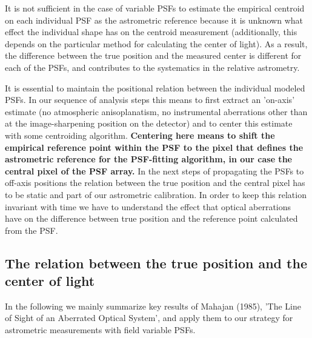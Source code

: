 It is not sufficient in the case of variable PSFs to estimate the empirical centroid on each individual PSF as the astrometric reference because it is unknown what effect the individual shape has on the centroid measurement (additionally, this depends on the particular method for calculating the center of light). As a result, the difference between the true position and the measured center is different for each of the PSFs, and contributes to the systematics in the relative astrometry.

It is essential to maintain the positional relation between the individual modeled PSFs. In our sequence of analysis steps this means to first extract an 'on-axis' estimate (no atmospheric anisoplanatism, no instrumental aberrations other than at the image-sharpening position on the detector) and to center this estimate with some centroiding algorithm. {\bf Centering here means to shift the empirical reference point within the PSF to the pixel that defines the astrometric reference for the PSF-fitting algorithm, in our case the central pixel of the PSF array.} In the next steps of propagating the PSFs to off-axis positions the relation between the true position and the central pixel has to be static and part of our astrometric calibration. In order to keep this relation invariant with time we have to understand the effect that optical aberrations have on the difference between true position and the reference point calculated from the PSF.  

\subsection{The relation between the true position and the center of light}

In the following we mainly summarize key results of Mahajan (1985), 'The Line of Sight of an Aberrated Optical System', and apply them to our strategy for astrometric measurements with field variable PSFs.

  
